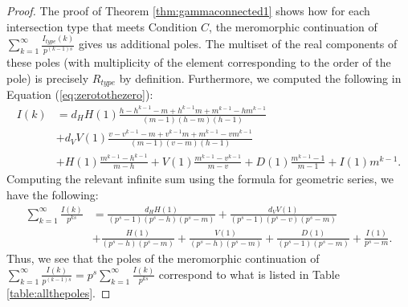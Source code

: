 \documentclass{article}
\theoremstyle{plain}
\numberwithin{equation}{section}
\numberwithin{table}{section}
\numberwithin{figure}{section}
\newcommand{\vaddspace}[1]{\rule{0pt}{#1pt}}
\newcommand{\newparagraph}{\vaddspace{10}}
\begin{document}
\begin{proof}
The proof of Theorem \ref{thm:gammaconnected1} shows how for each intersection type that meets Condition $C$, the meromorphic continuation of $\displaystyle \sum_{k=1}^{\infty} \frac{I_{type}(k)}{p^{(k-1)s}}$ gives us additional poles. The multiset of the real components of these poles (with multiplicity of the element corresponding to the order of the pole) is precisely $R_{type}$ by definition. Furthermore, we computed the following in Equation (\ref{eq:zerotothezero}):
\begin{align}
I(k) &= d_H H(1) \frac{h - h^{k-1} - m + h^{k-1} m + m^{k-1} - h m^{k-1}}{(m-1)(h-m)(h-1)}\nonumber\\& %
+ d_V V(1) \frac{v - v^{k-1} - m + v^{k-1} m + m^{k-1} - v m^{k-1}}{(m-1)(v-m)(h-1)}\nonumber\\& %
+ H(1) \frac{m^{k-1} - h^{k-1}}{m-h}
+ V(1) \frac{m^{k-1} - v^{k-1}}{m-v}
+ D(1) \frac{m^{k-1} - 1}{m-1}
+ I(1) m^{k-1}.
\end{align}
Computing the relevant infinite sum using the formula for geometric series, we have the following:
\begin{align}
\sum_{k=1}^{\infty} \frac{I(k)}{p^{ks}} &= \frac{d_H H(1)}{(p^s-1)(p^s-h)(p^s-m)}
+ \frac{d_V V(1)}{(p^s-1)(p^s-v)(p^s-m)}\nonumber\\&
+ \frac{H(1)}{(p^s-h)(p^s-m)}
+ \frac{V(1)}{(p^s-h)(p^s-m)}
+ \frac{D(1)}{(p^s-1)(p^s-m)}
+ \frac{I(1)}{p^s-m}.
\end{align}
Thus, we see that the poles of the meromorphic continuation of $\displaystyle \sum_{k=1}^{\infty} \frac{I(k)}{p^{(k-1)s}} = p^s \sum_{k=1}^{\infty} \frac{I(k)}{p^{ks}}$ correspond to what is listed in Table \ref{table:allthepoles}.
\end{proof}
\newparagraph
\end{document}
